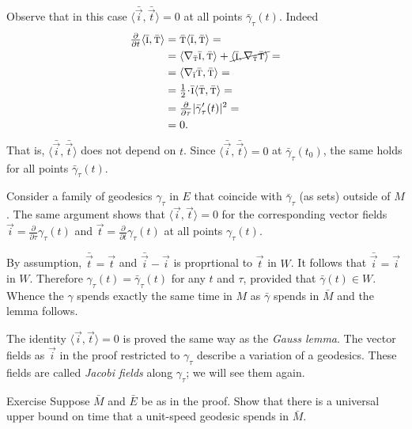 Observe that in this case $\langle\bar{\vec i},\bar{\vec t}\rangle=0$ at all points $\bar\gamma_\tau(t)$.
Indeed 
\begin{align*}
\tfrac{\partial}{\partial t}\langle\bar{\vec i},\bar{\vec t}\rangle&=
\bar{\vec t}\langle\bar{\vec i},\bar{\vec t}\rangle=
\\
&=
\langle\nabla_{\bar{\vec t}}\bar{\vec i},\bar{\vec t}\rangle+\cancel{\langle\bar{\vec i},\nabla_{\bar{\vec t}}\bar{\vec t}\rangle}=
\\
&=\langle\nabla_{\bar{\vec i}}\bar{\vec t},\bar{\vec t}\rangle=
\\
&=\tfrac12\cdot\bar{\vec i}\langle\bar{\vec t},\bar{\vec t}\rangle=
\\
&=\tfrac{\partial}{\partial \tau}|\bar\gamma_\tau'(t)|^2=
\\
&=0.
\end{align*}
That is, $\langle\bar{\vec i},\bar{\vec t}\rangle$ does not depend on $t$.
Since $\langle\bar{\vec i},\bar{\vec t}\rangle=0$ at $\bar\gamma_\tau(t_0)$, the same holds for all points  $\bar\gamma_\tau(t)$.

Consider a family of geodesics $\gamma_\tau$ in $E$ that coincide with $\bar\gamma_\tau$ (as sets) outside of $M$.
The same argument shows that $\langle\vec i,\vec t\rangle=0$ for the corresponding vector fields ${\vec i}
=\tfrac{\partial}{\partial\tau}\gamma_\tau(t)$ and $\vec t
=\tfrac{\partial}{\partial t}\gamma_\tau(t)$
at all points $\gamma_\tau(t)$.

By assumption, $\bar{\vec t}=\vec t$ and
$\bar{\vec i}-\vec i$ is proprtional to $\vec t$ in $W$.
It follows that $\bar{\vec i}=\vec i$ in $W$.
Therefore $\gamma_\tau(t)=\bar\gamma_\tau(t)$ for any $t$ and $\tau$, provided that $\bar\gamma(t)\in W$.
Whence the $\gamma$ spends exactly the same time in $M$ as 
$\bar \gamma$ spends in $\bar M$ and the lemma follows.\qeds

The identity $\langle\vec i,\vec t\rangle=0$ is proved the same way as the \emph{Gauss lemma}.
The vector fields as $\vec i$ in the proof restricted to $\gamma_\tau$ describe a variation of a geodesics.
These fields are called \emph{Jacobi fields} along $\gamma_\tau$;
we will see them again.

\begin{thm}{Exercise}\label{ex:exit-time}
Suppose $\bar M$ and $\bar E$ be as in the proof.
Show that there is a universal upper bound on time that a unit-speed geodesic spends in $\bar M$.
\end{thm}

